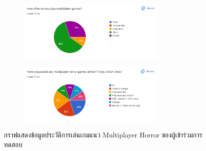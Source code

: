 \begin{figure}[h]
\begin{subfigure}{\textwidth}
    \begin{center}
    \includegraphics[width=0.8\textwidth]{./img/result/3.png}
    \end{center}
\end{subfigure}
\begin{subfigure}{\textwidth}
    \begin{center}
    \includegraphics[width=0.8\textwidth]{./img/result/4.png}
    \end{center}
\end{subfigure}
\caption{กราฟแสดงข้อมูลประวัติการเล่นเกมแนว Multiplayer Horror ของผู้เข้าร่วมการทดสอบ}
\end{figure}


